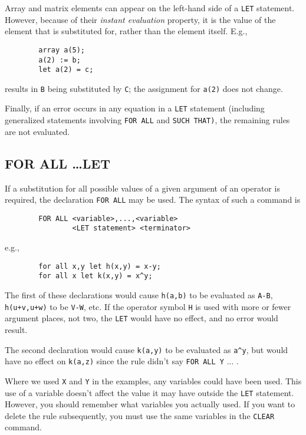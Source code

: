 Array and matrix elements can appear on the left-hand side of a {\tt LET}
statement. However, because of their {\em instant evaluation\/}
 property, it is the value of the element that
is substituted for, rather than the element itself.  E.g.,
\begin{verbatim}
        array a(5);
        a(2) := b;
        let a(2) = c;
\end{verbatim}
results in {\tt B} being substituted by {\tt C}; the assignment for
{\tt a(2)} does not change.

Finally, if an error occurs in any equation in a {\tt LET} statement
(including generalized statements involving {\tt FOR ALL} and {\tt SUCH
THAT)}, the remaining rules are not evaluated.

\subsection{FOR ALL \ldots LET}
\hypertarget{command:FORALL}{}
If a substitution for all possible values of a given argument of an
operator is required, the declaration {\tt FOR ALL} may be used. The
syntax of such a command is
\begin{verbatim}
        FOR ALL <variable>,...,<variable>
                <LET statement> <terminator>
\end{verbatim}
e.g.,
\begin{verbatim}
        for all x,y let h(x,y) = x-y;
        for all x let k(x,y) = x^y;
\end{verbatim}
The first of these declarations would cause {\tt h(a,b)} to be evaluated
as {\tt A-B}, {\tt h(u+v,u+w)} to be {\tt V-W}, etc.  If the operator
symbol {\tt H} is used with more or fewer argument places, not two, the
{\tt LET} would have no effect, and no error would result.

The second declaration would cause {\tt k(a,y)} to be evaluated as
{\tt a\verb|^|y}, but would have no effect on {\tt k(a,z)} since the rule
didn't say {\tt FOR ALL Y} ... .

Where we used {\tt X} and {\tt Y} in the examples, any variables could
have been used.  This use of a variable doesn't affect the value it may
have outside the {\tt LET} statement.  However, you should remember what
variables you actually used.  If you want to delete the rule subsequently,
you must use the same variables in the {\tt CLEAR} command.

